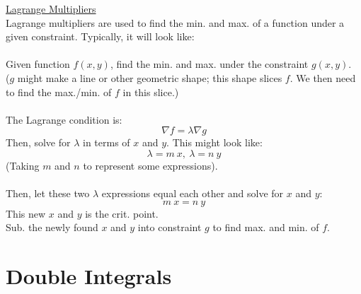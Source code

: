 \documentclass[12pt]{article}
\begin{document}
\underline{Lagrange Multipliers}\\
Lagrange multipliers are used to find the min. and max. of a function under a given constraint. Typically, it will look like:\\\\
Given function $f(x,y)$, find the min. and max. under the constraint $g(x,y)$.\\
\indent
($g$ might make a line or other geometric shape; this shape slices $f$. We then need to find the max./min. of $f$ in this slice.)\\\\

The Lagrange condition is:
$$
\nabla f = \lambda \nabla g
$$
Then, solve for $\lambda$ in terms of $x$ and $y$. This might look like:
$$
\lambda = m \ x, \ \lambda = n \ y
$$
(Taking $m$ and $n$ to represent some expressions).\\\\

Then, let these two $\lambda$ expressions equal each other and solve for $x$ and $y$:\\
$$
m \ x = n \ y
$$
This new $x$ and $y$ is the crit. point.\\
Sub. the newly found $x$ and $y$ into constraint $g$ to find max. and min. of $f$.

\section*{Double Integrals}
\end{document}

